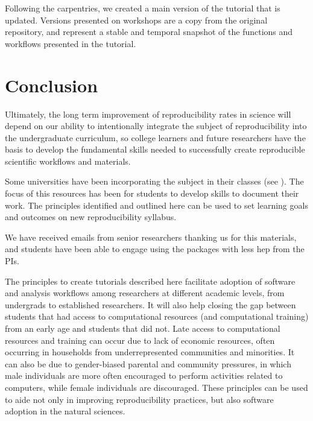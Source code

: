 \documentclass[12pt]{article}
\begin{document}
Following the carpentries, we created a main version of the tutorial that
is updated. Versions presented on workshops are a copy from the original repository,
and represent a stable and temporal snapshot of the functions and workflows presented
in the tutorial.


\section*{Conclusion}
\label{sec:conclusion}

Ultimately, the long term improvement of reproducibility rates in science will depend
on our ability to intentionally integrate the subject of reproducibility into the
undergraduate curriculum, so college learners and future researchers have the
basis to develop the fundamental skills needed to successfully create reproducible
scientific workflows and materials.

Some universities have been incorporating the subject in their classes (see
\cite{uwlibraries2022, nigms2022}).
The focus of this resources has been for students to develop skills to document their work.
The principles identified and outlined here can be used to set learning goals and
outcomes on new reproducibility syllabus.





We have received emails from senior researchers thanking us for this materials,
 and students have been able to engage using the packages with less hep from the PIs.

The principles to create tutorials described here facilitate adoption of software
 and analysis workflows among researchers at different academic levels, from undergrads
  to established researchers.
It will also help closing the gap between students that had access to computational
 resources (and computational training) from an early age and students that did not.
  Late access to computational resources and training can occur due to lack of
   economic resources, often occurring in households from underrepresented communities
    and minorities.
It can also be due to gender-biased parental and community pressures,
 in which male individuals are more often encouraged to perform activities related to computers,
  while female individuals are discouraged.
These principles can be used to aide not only in improving reproducibility practices,
 but also software adoption in the natural sciences.
\end{document}
